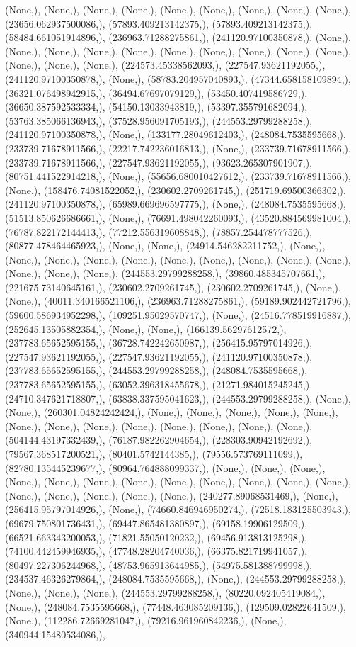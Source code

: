 \documentclass{article}
\begin{document}
(None,), (None,), (None,), (None,), (None,), (None,), (None,), (None,), (None,), (23656.062937500086,), (57893.409213142375,), (57893.409213142375,), (58484.661051914896,), (236963.71288275861,), (241120.97100350878,), (None,), (None,), (None,), (None,), (None,), (None,), (None,), (None,), (None,), (None,), (None,), (None,), (None,), (224573.45338562093,), (227547.93621192055,), (241120.97100350878,), (None,), (58783.204957040893,), (47344.658158109894,), (36321.076498942915,), (36494.67697079129,), (53450.407419586729,), (36650.387592533334,), (54150.13033943819,), (53397.355791682094,), (53763.385066136943,), (37528.956091705193,), (244553.29799288258,), (241120.97100350878,), (None,), (133177.28049612403,), (248084.7535595668,), (233739.71678911566,), (22217.742236016813,), (None,), (233739.71678911566,), (233739.71678911566,), (227547.93621192055,), (93623.265307901907,), (80751.441522914218,), (None,), (55656.680010427612,), (233739.71678911566,), (None,), (158476.74081522052,), (230602.2709261745,), (251719.69500366302,), (241120.97100350878,), (65989.669696597775,), (None,), (248084.7535595668,), (51513.850626686661,), (None,), (76691.498042260093,), (43520.884569981004,), (76787.822172144413,), (77212.556319608848,), (78857.254478777526,), (80877.478464465923,), (None,), (None,), (24914.546282211752,), (None,), (None,), (None,), (None,), (None,), (None,), (None,), (None,), (None,), (None,), (None,), (None,), (None,), (244553.29799288258,), (39860.485345707661,), (221675.73140645161,), (230602.2709261745,), (230602.2709261745,), (None,), (None,), (40011.340166521106,), (236963.71288275861,), (59189.902442721796,), (59600.586934952298,), (109251.95029570747,), (None,), (24516.778519916887,), (252645.13505882354,), (None,), (None,), (166139.56297612572,), (237783.65652595155,), (36728.742242650987,), (256415.95797014926,), (227547.93621192055,), (227547.93621192055,), (241120.97100350878,), (237783.65652595155,), (244553.29799288258,), (248084.7535595668,), (237783.65652595155,), (63052.396318455678,), (21271.984015245245,), (24710.347621718807,), (63838.337595041623,), (244553.29799288258,), (None,), (None,), (260301.04824242424,), (None,), (None,), (None,), (None,), (None,), (None,), (None,), (None,), (None,), (None,), (None,), (None,), (None,), (504144.43197332439,), (76187.982262904654,), (228303.90942192692,), (79567.368517200521,), (80401.5742144385,), (79556.573769111099,), (82780.135445239677,), (80964.764888099337,), (None,), (None,), (None,), (None,), (None,), (None,), (None,), (None,), (None,), (None,), (None,), (None,), (None,), (None,), (None,), (None,), (None,), (240277.89068531469,), (None,), (256415.95797014926,), (None,), (74660.846946950274,), (72518.183125503943,), (69679.750801736431,), (69447.865481380897,), (69158.19906129509,), (66521.663343200053,), (71821.55050120232,), (69456.913813125298,), (74100.442459946935,), (47748.28204740036,), (66375.821719941057,), (80497.227306244968,), (48753.965913644985,), (54975.581388799998,), (234537.46326279864,), (248084.7535595668,), (None,), (244553.29799288258,), (None,), (None,), (None,), (244553.29799288258,), (80220.092405419084,), (None,), (248084.7535595668,), (77448.463085209136,), (129509.02822641509,), (None,), (112286.72669281047,), (79216.961960842236,), (None,), (340944.15480534086,), 
\end{document}
